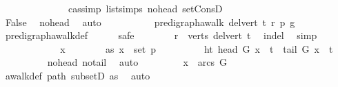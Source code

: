 \begin{isabellebody}
\ \ \ \ \ \ \ \ \ \ \ \ \ \ cas{\isacharunderscore}{\kern0pt}simp\ list{\isachardot}{\kern0pt}simps{\isacharparenleft}{\kern0pt}{}{\isacharparenright}{\kern0pt}\ no{\isacharunderscore}{\kern0pt}head\ set{\isacharunderscore}{\kern0pt}ConsD{\isacharparenright}{\kern0pt}\ \ \isanewline
\ \ \ \ \ \ \isamarkupfalse%
\ \ \isanewline
\ \ \ \ \ \ \isamarkupfalse%
\ \isamarkupfalse%
\ False\ \isamarkupfalse%
\ no{\isacharunderscore}{\kern0pt}head\ \isamarkupfalse%
\ auto\isanewline
\ \ \ \ \isamarkupfalse%
\isanewline
\ \ \ \ \isamarkupfalse%
\ {\isachardoublequoteopen}pre{\isacharunderscore}{\kern0pt}digraph{\isachardot}{\kern0pt}awalk\ {\isacharparenleft}{\kern0pt}del{\isacharunderscore}{\kern0pt}vert\ t{\isacharparenright}{\kern0pt}\ r\ p\ g{\isachardoublequoteclose}\ \isanewline
\ \ \ \ \ \ \isamarkupfalse%
\ pre{\isacharunderscore}{\kern0pt}digraph{\isachardot}{\kern0pt}awalk{\isacharunderscore}{\kern0pt}def\isanewline
\ \ \ \ \isamarkupfalse%
\ safe\isanewline
\ \ \ \ \ \ \isamarkupfalse%
\ {\isachardoublequoteopen}r\ {\isasymin}\ verts\ {\isacharparenleft}{\kern0pt}del{\isacharunderscore}{\kern0pt}vert\ t{\isacharparenright}{\kern0pt}{\isachardoublequoteclose}\ \isamarkupfalse%
\ in{\isacharunderscore}{\kern0pt}del\ \isamarkupfalse%
\ simp\ \ \ \isanewline
\ \ \ \ \isamarkupfalse%
\isanewline
\ \ \ \ \ \ \isamarkupfalse%
\ x\isanewline
\ \ \ \ \ \ \isamarkupfalse%
\ as{}{\isacharcolon}{\kern0pt}\ {\isachardoublequoteopen}x\ {\isasymin}\ set\ p{\isachardoublequoteclose}\isanewline
\ \ \ \ \ \ \isamarkupfalse%
\ \isamarkupfalse%
\ ht{\isacharcolon}{\kern0pt}\ {\isachardoublequoteopen}head\ G\ x\ {\isasymnoteq}\ t\ {\isasymand}\ tail\ G\ x\ {\isasymnoteq}\ t{\isachardoublequoteclose}\isanewline
\ \ \ \ \ \ \ \ \isamarkupfalse%
\ no{\isacharunderscore}{\kern0pt}head\ no{\isacharunderscore}{\kern0pt}tail\ \isamarkupfalse%
\ auto\isanewline
\ \ \ \ \ \ \isamarkupfalse%
\ {\isachardoublequoteopen}\ x\ {\isasymin}\ arcs\ G{\isachardoublequoteclose}\ \isanewline
\ \ \ \ \ \ \ \ \isamarkupfalse%
\ awalk{\isacharunderscore}{\kern0pt}def\ path\ subsetD\ as{}\ \isamarkupfalse%
\ auto\isanewline
\ \ \ \ \ \ \isamarkupfalse%
\ \isamarkupfalse%

\end{isabellebody}
